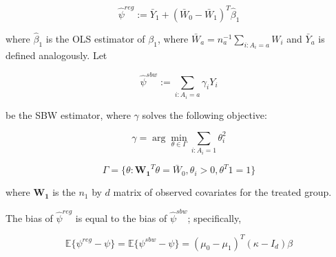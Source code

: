 $$
\hat{\psi}^{reg} := \bar{Y}_1 + (\bar{W}_0 - \bar{W}_1)^T\hat{\beta}_1
$$ 

where $\hat{\beta}_1$ is the OLS estimator of $\beta_1$, where $\bar{W}_a = n_a^{-1}\sum_{i:A_i = a} W_i$ and $\bar{Y}_a$ is defined analogously. Let 

$$
\hat{\psi}^{sbw} := \sum_{i: A_i = a} \gamma_i Y_i
$$ 

be the SBW estimator, where $\gamma$ solves the following objective:

$$
\gamma = \arg\min_{\theta \in \Gamma} \sum_{i: A_i = 1}\theta_i^2
$$

$$
\Gamma = \{\theta: \mathbf{W_1}^T\theta = \bar{W}_0, \theta_i > 0, \theta^T1 = 1\}
$$

where $\mathbf{W_1}$ is the $n_1$ by $d$ matrix of observed covariates for the treated group.

\begin{proposition}\label{cl1}
The bias of $\hat{\psi}^{reg}$ is equal to the bias of $\hat{\psi}^{sbw}$; specifically, 

$$
\mathbb{E}\{\psi^{reg} - \psi\} = \mathbb{E}\{\psi^{sbw} - \psi\} = (\mu_0 - \mu_1)^T(\kappa - I_d)\beta
$$
\end{proposition}

